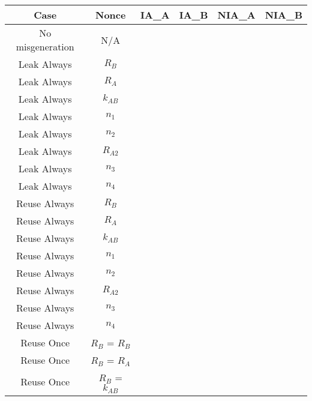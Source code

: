 \documentclass[crop]{standalone}
\newcommand{\noattack}{\color{ForestGreen}\usym{2713}\color{black}}
\newcommand{\attack}{\color{red}\usym{2717}\color{black}}
\begin{document}
\parbox{15cm}{
\begin{tabular}{|c|c|c|c|c|c|}
\hline
Case & Nonce & IA\_A & IA\_B & NIA\_A & NIA\_B \\ \hline
No misgeneration & N/A & \noattack & \noattack & \noattack & \noattack\\ \hline
Leak Always & $R_B$ & \noattack & \noattack & \noattack & \noattack\\ \hline
Leak Always & $R_A$ & \noattack & \noattack & \noattack & \noattack\\ \hline
Leak Always & $k_{AB}$ & \attack & \attack & \attack & \attack\\ \hline
Leak Always & $n_1$ & \noattack & \noattack & \noattack & \noattack\\ \hline
Leak Always & $n_2$ & \noattack & \noattack & \noattack & \noattack\\ \hline
Leak Always & $R_{A2}$ & \noattack & \noattack & \noattack & \noattack\\ \hline
Leak Always & $n_3$ & \noattack & \noattack & \noattack & \noattack\\ \hline
Leak Always & $n_4$ & \noattack & \noattack & \noattack & \noattack\\ \hline
Reuse Always & $R_B$ & \noattack & \attack & \noattack & \noattack\\ \hline
Reuse Always & $R_A$ & \noattack & \noattack & \noattack & \noattack\\ \hline
Reuse Always & $k_{AB}$ & \attack & \attack & \attack & \attack\\ \hline
Reuse Always & $n_1$ & \noattack & \noattack & \noattack & \noattack\\ \hline
Reuse Always & $n_2$ & \noattack & \noattack & \noattack & \noattack\\ \hline
Reuse Always & $R_{A2}$ & \noattack & \noattack & \noattack & \noattack\\ \hline
Reuse Always & $n_3$ & \noattack & \noattack & \noattack & \noattack\\ \hline
Reuse Always & $n_4$ & \noattack & \noattack & \noattack & \noattack\\ \hline
Reuse Once & $R_B$ = $R_B$ & \noattack & \attack & \noattack & \noattack\\ \hline
Reuse Once & $R_B$ = $R_A$ & \noattack & \noattack & \noattack & \noattack\\ \hline
Reuse Once & $R_B$ = $k_{AB}$ & \attack & \attack & \attack & \attack\\ \hline

\end{tabular}}
\end{document}
